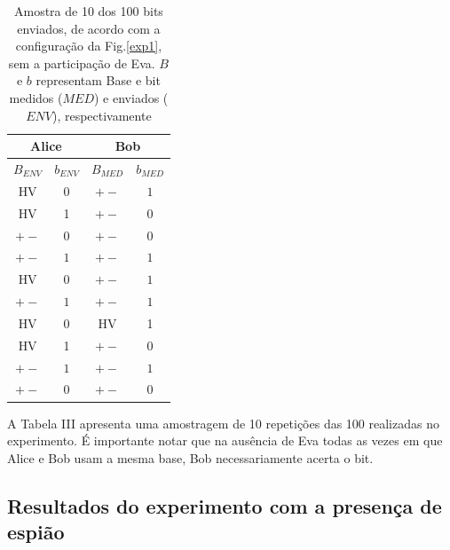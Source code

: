 \documentclass[pra, twocolumn]{revtex4}
\begin{document}
\begin{table}[H]
\begin{center}
\begin{tabular}{|c|c|c|c|}
\hline
\multicolumn{2}{|c|}{Alice} & \multicolumn{2}{|c|}{Bob} \\ \hline
$B_{ENV}$  & $b_{ENV}$ & $B_{MED}$ & $b_{MED}$ \\ \hline
HV & 0 & $+-$ & $1$ \\ \hline
HV & 1 & $+-$ & $0$ \\ \hline
$+-$ & $0$ & $+-$ & $0$ \\ \hline
$+-$ & $1$ & $+-$ & $1$ \\ \hline
HV & 0 & $+-$ & $1$ \\ \hline
$+-$ & $1$ & $+-$ & $1$ \\ \hline
HV & 0 & HV & 1 \\ \hline
HV & 1 & $+-$ & $0$ \\ \hline
$+-$ & $1$ & $+-$ & $1$  \\ \hline
$+-$ & $0$ & $+-$ & $0$  \\ \hline
\end{tabular}
\end{center}
\caption{Amostra de 10 dos 100 bits enviados, de acordo com a configura\c c\~ao da Fig.\ref{exp1}, sem a participa\c c\~ao de Eva. $B$ e $b$ representam Base e bit medidos ($MED$) e enviados ($ENV$), respectivamente}
\label{tabela3}
\end{table}

 A Tabela III apresenta uma amostragem de 10 repeti\c c\~oes das 100 realizadas no experimento. \'E importante notar que na aus\^encia de Eva todas as vezes em que Alice e Bob usam a mesma base, Bob necessariamente acerta o bit.




\subsection{Resultados do experimento com a presen\c ca de espi\~ao}
\end{document}
